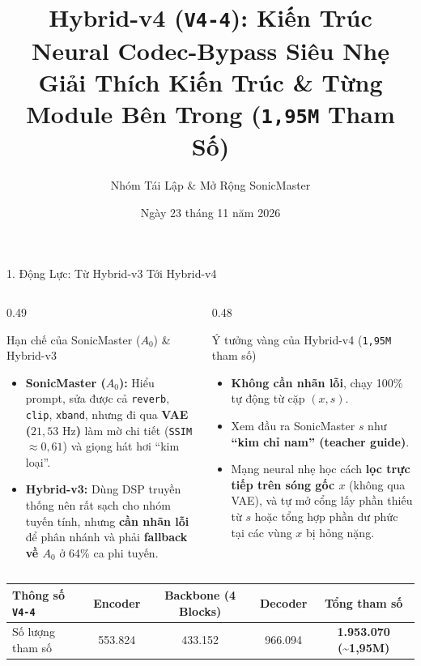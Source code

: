 \documentclass[aspectratio=169,10pt]{beamer}
\title[Hybrid-v4 (V4-4): Neural Codec-Bypass]{\textbf{Hybrid-v4 (\texttt{V4-4}): Kiến Trúc Neural Codec-Bypass Siêu Nhẹ}\\ \large Giải Thích Kiến Trúc \& Từng Module Bên Trong (\texttt{1,95M} Tham Số)}
\author{Nhóm Tái Lập \& Mở Rộng SonicMaster}
\date{Ngày 23 tháng 11 năm 2026}
\begin{document}
\begin{frame}
  \titlepage
\end{frame}

\begin{frame}{1. Động Lực: Từ Hybrid-v3 Tới Hybrid-v4}
  \begin{columns}[T]
    \begin{column}{0.49\textwidth}
      \footnotesize
      \begin{block}{Hạn chế của SonicMaster ($A_0$) \& Hybrid-v3}
        \begin{itemize}
          \item \textbf{SonicMaster ($A_0$):} Hiểu prompt, sửa được cả \texttt{reverb}, \texttt{clip}, \texttt{xband}, nhưng đi qua \textbf{VAE ($21{,}53\text{ Hz}$)} làm mờ chi tiết (\texttt{SSIM} $\approx 0{,}61$) và giọng hát hơi ``kim loại''.
          \item \textbf{Hybrid-v3:} Dùng DSP truyền thống nên rất sạch cho nhóm tuyến tính, nhưng \textbf{cần nhãn lỗi} để phân nhánh và phải \textbf{fallback về $A_0$} ở 64\% ca phi tuyến.
        \end{itemize}
      \end{block}
    \end{column}
    \begin{column}{0.48\textwidth}
      \footnotesize
      \begin{exampleblock}{Ý tưởng vàng của Hybrid-v4 (\texttt{1,95M} tham số)}
        \begin{itemize}
          \item \textbf{Không cần nhãn lỗi}, chạy 100\% tự động từ cặp $(x, s)$.
          \item Xem đầu ra SonicMaster $s$ như \textbf{``kim chỉ nam'' (teacher guide)}.
          \item Mạng neural nhẹ học cách \textbf{lọc trực tiếp trên sóng gốc $x$} (không qua VAE), và tự mở cổng lấy phần thiếu từ $s$ hoặc tổng hợp phần dư phức tại các vùng $x$ bị hỏng nặng.
        \end{itemize}
      \end{exampleblock}
    \end{column}
  \end{columns}
  \vspace{0.4em}
  \centering
  \footnotesize
  \begin{tabular}{lcccc}
    \toprule
    \textbf{Thông số \texttt{V4-4}} & \textbf{Encoder} & \textbf{Backbone (4 Blocks)} & \textbf{Decoder} & \textbf{Tổng tham số} \\
    \midrule
    Số lượng tham số & 553.824 & 433.152 & 966.094 & \textbf{1.953.070 (\textasciitilde 1,95M)} \\
    \bottomrule
  \end{tabular}
\end{frame}
\end{document}
